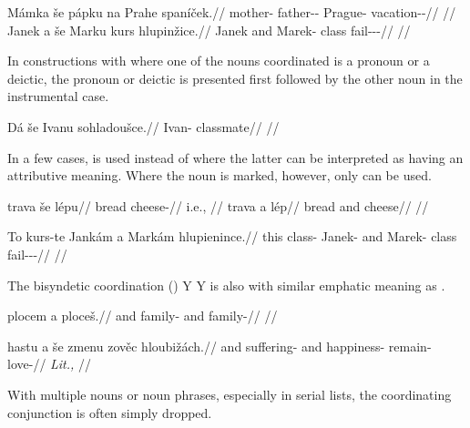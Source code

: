 \pex
\begingl
    \gla Mámka {še} pápku na Prahe spaníček.//
    \glb mother-\Dim{} \Com{} father-\Dim{}-\Ins{} \Loc{} Prague-\Acc{} vacation-\Av{}-\Pf{}//
    \glft {}//
\endgl
\xe
\pex
\begingl
    \gla Janek {a} {še} Marku kurs hlupinžice.//
    \glb Janek and \Com{} Marek-\Ins{} class fail-\Av{}-\Pf{}-\Quot{}//
    \glft {}//
\endgl
\xe

In constructions with  where one of the nouns coordinated is a pronoun
or a deictic, the pronoun or deictic is presented first followed
by the other noun in the instrumental case.

\pex
\begingl
    \gla Dá {še} Ivanu sohladoušce.// \glb \First{}\Sg{} \Com{} Ivan-\Ins{}
    classmate// \glft {}//
\endgl
\xe

In a few cases,  is used instead of  where the latter can be
interpreted as having an attributive meaning. Where the noun is marked, however,
only  can be used.

\begin{multicols}{2}
\pex\a
\begingl
    \gla trava {še} lépu//
    \glb bread \Com{} cheese-\Ins{}//
    \glft {} i.e., //
\endgl
\a
\begingl
    \gla trava {a} lép//
    \glb bread and cheese//
    \glft {}//
\endgl
\xe\end{multicols}

\pex
\begingl
    \gla To kurs-te Jankám {a} Markám hlupienince.//
    \glb this class-\Foc{} Janek-\Agt{} and Marek-\Agt{} class fail-\Pv{}-\Pf{}-\Quot{}//
    \glft {}//
\endgl
\xe


The bisyndetic coordination (\cite{velupillai2012})  Y  Y is also
with similar emphatic meaning as .

\pex
\begingl
     plocem {a} ploceš.//
    \glb and family-\First{}\Sg{} and family-\Second{}\Sg{}//
    \glft {}//
\endgl
\xe

\pex
\begingl
     hastu {a} še zmenu zověc hloubižách.//
    \glb and suffering-\mk{} and \Com{} happiness-\Ins{} remain-\Cv{} love-//
    \glft {} \emph{Lit.,} //
\endgl
\xe

With multiple nouns or noun phrases, especially in serial lists, the
coordinating conjunction is often simply dropped.

